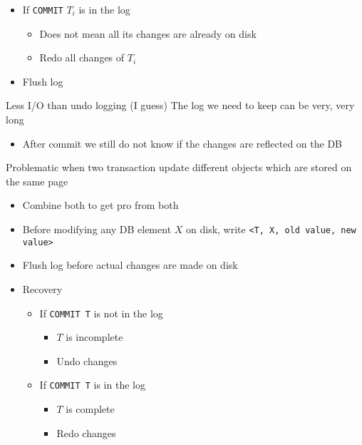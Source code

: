 \begin{itemize}
\begin{itemize}
\begin{itemize}
\begin{itemize}
                        \end{itemize}
                    \item If \verb+COMMIT+ $T_i$ is in the log
                        \begin{itemize}
                            \item Does not mean all its changes are already on disk
                            \item Redo all changes of $T_i$
                        \end{itemize}
                    \item Flush log
                \end{itemize}
            \ipro Less I/O than undo logging (I guess)
            \icon The log we need to keep can be very, very long
                \begin{itemize}
                    \item After commit we still do not know if the changes are reflected on the DB
                \end{itemize}
            \icon Problematic when two transaction update different objects which are stored on the same page
        \end{itemize}
        \begin{itemize}
            \item Combine both to get pro from both
            \item Before modifying any DB element $X$ on disk, write \verb+<T, X, old value, new value>+
            \item Flush log before actual changes are made on disk
            \item Recovery
                \begin{itemize}
                    \item If \verb+COMMIT T+ is not in the log
                        \begin{itemize}
                            \item $T$ is incomplete
                            \item Undo changes
                        \end{itemize}
                    \item If \verb+COMMIT T+ is in the log
                        \begin{itemize}
                            \item $T$ is complete
                            \item Redo changes
                        \end{itemize}
                \end{itemize}
        \end{itemize}
\end{itemize}
